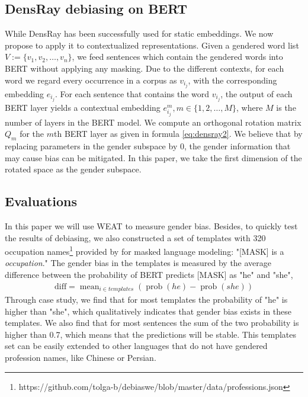 \subsection{DensRay debiasing on BERT}
While DensRay has been successfully used for static embeddings. We now propose to apply it to contextualized representations. Given a gendered word list $V:=\{v_1,v_2,\dots,v_n\}$, we feed sentences which contain the gendered words into BERT without applying any masking. Due to the different contexts, for each word we regard every occurrence in a corpus as $v_{i_j}$, with the corresponding embedding $e_{i_j}$. For each sentence that contains the word $v_{i_j}$, the output of each BERT layer yields a contextual embedding $e_{i_j}^m,m\in\{1,2,\dots,M\}$, where $M$ is the number of layers in the BERT model. We compute an orthogonal rotation matrix $Q_m$ for the $m$th BERT layer as given in formula \ref{eq:densray2}. We believe that by replacing parameters in the gender subspace by $0$, the gender information that may cause bias can be mitigated. In this paper, we take the first dimension of the rotated space as the gender subspace.

\subsection{Evaluations}\label{sec:eval}
In this paper we will use WEAT to measure gender bias. Besides, to quickly test the results of debiasing, we also constructed a set of templates with 320 occupation names\footnote{https://github.com/tolga-b/debiaswe/blob/master/data/professions.json} provided by \citet{bolukbasi2016man} for masked language modeling: "[MASK] is a \textit{occupation}." The gender bias in the templates is measured by the average difference between the probability of BERT predicts [MASK] as "he" and "she",
\begin{eqnarray}
    \text{diff}=\mathop{mean}_{i \in templates}(\mathop{prob}(he)-\mathop{prob}(she))\nonumber
\end{eqnarray}
Through case study, we find that for most templates the probability of "he" is higher than "she", which qualitatively indicates that gender bias exists in these templates. We also find that for most sentences the sum of the two probability is higher than 0.7, which means that the predictions will be stable. This templates set can be easily extended to other languages that do not have gendered profession names, like Chinese or Persian.
